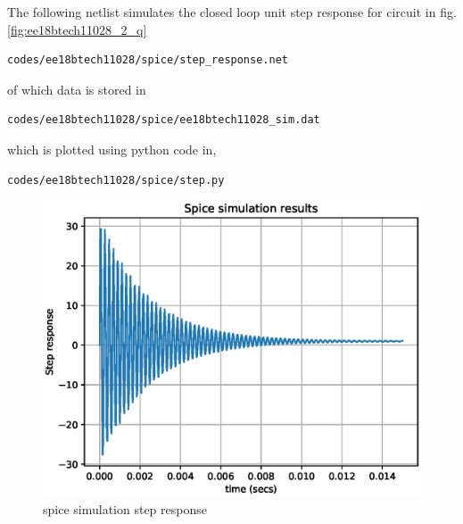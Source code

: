 \begin{enumerate}[label=\arabic*.,ref=\theenumi]
The following netlist simulates the closed loop unit step response for circuit in fig. \ref{fig:ee18btech11028_2_q}
\begin{lstlisting}
codes/ee18btech11028/spice/step_response.net
\end{lstlisting}
of which data is stored in 
\begin{lstlisting}
codes/ee18btech11028/spice/ee18btech11028_sim.dat
\end{lstlisting}
which is plotted using python code in,
\begin{lstlisting}
codes/ee18btech11028/spice/step.py
\end{lstlisting}
\begin{figure}[!ht]
    \centering
    \includegraphics[width=\columnwidth]{./figs/ee18btech11028/spice_step_response.eps}
    \caption{spice simulation step response}
    \label{fig:ee18btech11028_2_6}
\end{figure}


\end{enumerate}
